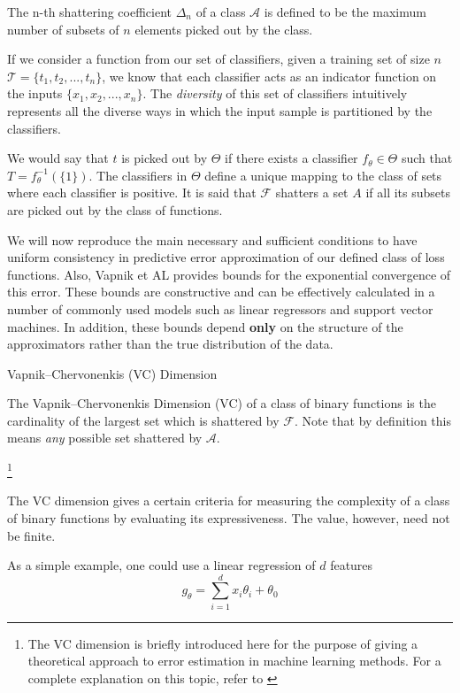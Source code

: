 The n-th shattering coefficient $\Delta_n$ of a class $\mathcal {A}$ is defined to be the maximum number of subsets of $n$ elements picked out by the class.

If we consider a function from our set of classifiers, given a training set of size $n$
$\mathcal {T} = \{ t_1,t_2,...,t_n \}$, we know that each classifier acts as an indicator function on the inputs $\{ x_1,x_2,...,x_n \}$. The \textit{diversity} of this set of classifiers intuitively represents all the diverse ways in which the input sample is partitioned by the classifiers.

We would say that $t$ is picked out by $\Theta$ if there exists a classifier $f_{\theta} \in \Theta$ such that $T = f_{\theta}^{-1}(\{1\})$. The classifiers in $\Theta$ define a unique mapping to the class of sets where each classifier is positive. It is said that $\mathcal {F}$ shatters a set $A$ if all its subsets are picked out by the class of functions.

We will now reproduce the main necessary and sufficient conditions to have uniform consistency in predictive error approximation of our defined class of loss functions. Also,
Vapnik et AL provides bounds for the exponential convergence of this error. These bounds are constructive and can be effectively calculated in a number of commonly used models such as linear regressors and support vector machines. In addition, these bounds depend \textbf{only} on the structure of the approximators rather than the true distribution of the data.


\begin{definition}{Vapnik--Chervonenkis (VC) Dimension}

The Vapnik--Chervonenkis Dimension (VC) of a class of binary functions is the cardinality of the largest set which is shattered by $\mathcal {F}$. Note that by definition this means \textit{any} possible set shattered by $\mathcal {A}$.
\end{definition}\footnote{The VC dimension is briefly introduced here for the purpose of giving a theoretical approach to error estimation in machine learning methods. For a complete explanation on this topic, refer to \textcite{vapnik-nature2013}}

The VC dimension gives a certain criteria for measuring the complexity of a class of binary functions by evaluating its expressiveness. The value, however, need not be finite.

As a simple example, one could use a linear regression of $d$ features 
\begin{equation}
g_{\theta} = \sum_{i=1}^d x_i \theta_i + \theta_0
\end{equation}

